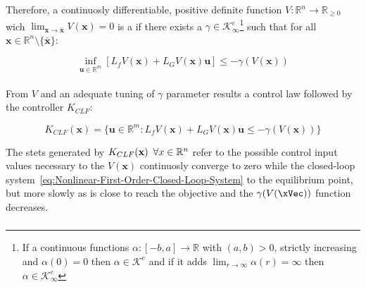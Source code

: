 Therefore, a continuosly differentiable, positive definite function \( V: \mathbb{R}^n \rightarrow \mathbb{R}_{\geq 0}  \) wich \( \lim_{\mathbf{x} \to \bar{\mathbf{x}}}{V(\mathbf{x})} = 0 \) is a  if there exists a \( \gamma \in \mathcal{K}^e_{\infty}  \)\footnote{If a continuous functions \(\alpha:[-b,a] \to \mathbb{R}\) with \((a,b) > 0\), strictly increasing and \(\alpha(0) = 0\) then \(\alpha \in \mathcal{K}^e\) and if it adds \(\lim_{r \to \infty} \alpha(r) = \infty\) then \(\alpha \in \mathcal{K}^e_{\infty}\)}  such that for all \( \mathbf{x} \in \mathbb{R}^n \setminus \{\bar{\mathbf{x}}\} \):

\begin{equation}
 \inf_{\mathbf{u} \in \mathbb{R}^m} [L_fV(\mathbf{x}) + L_GV(\mathbf{x})\mathbf{u}] \leq -\gamma(V(\mathbf{x}))
 \label{eq:CLF}
\end{equation}\\

From  \(V\) and an adequate tuning of \( \gamma \) parameter results a control law followed by the controller \(K_{CLF}\):

\begin{equation}
 K_{CLF}(\mathbf{x}) = \{ \mathbf{u} \in \mathbb{R}^m: L_fV(\mathbf{x}) + L_GV(\mathbf{x})\mathbf{u} \leq -\gamma(V(\mathbf{x})) \}
 \label{eq:K-CLF}
\end{equation}

The stets generated by \(K_{CLF}(\mathbf{x}) \hspace{0.5em} \forall x \in \mathbb{R}^n \) refer to the possible control input values necessary to the  \(V(\mathbf{x})\) continuosly converge to zero while the closed-loop system~\eqref{eq:Nonlinear-First-Order-Closed-Loop-System} to the equilibrium point, but more slowly as is close to reach the objective and the \(\gamma(V(\xVec))\) function decreases. \\


\subsubsection{}
\label{subsub:control_barrier_function}

